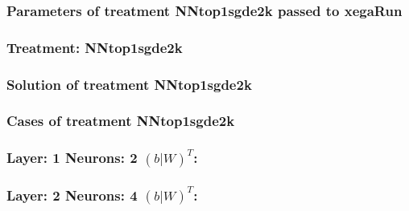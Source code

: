 \documentclass[18pt,c]{beamer}
\begin{document}

 \begin{frame}
 \fontsize{8pt}{9pt}\selectfont
 \frametitle{  Parameters of treatment NNtop1sgde2k passed to xegaRun
 }

 \label{ExpDtParmTable017.tex}  
 \end{frame}

 \begin{frame}
 \fontsize{8pt}{9pt}\selectfont
 \frametitle{ Treatment: NNtop1sgde2k }

 \label{ExpDStatsTable008.tex}  
 \end{frame}

 \begin{frame}
 \fontsize{8pt}{9pt}\selectfont
 \frametitle{ Solution of treatment NNtop1sgde2k }

 \label{ExpDSolutionTable017.tex}  
 \end{frame}

 \begin{frame}
 \fontsize{8pt}{9pt}\selectfont
 \frametitle{ Cases of treatment NNtop1sgde2k }

 \label{ExpDSolutionTable018.tex}  
 \end{frame}


 \begin{frame}
 \fontsize{8pt}{9pt}\selectfont
 \frametitle{ Layer: 1 Neurons: 2  $(b|W)^T$: 
 }

 \label{ExpDNNWeightTable015.tex}  
 \end{frame}


 \begin{frame}
 \fontsize{8pt}{9pt}\selectfont
 \frametitle{ Layer: 2 Neurons: 4  $(b|W)^T$: 
 }

 \label{ExpDNNWeightTable016.tex}  
 \end{frame}
\end{document}
